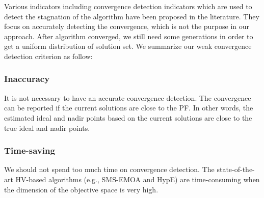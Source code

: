 \documentclass[conference]{IEEEtran}
\begin{document}
%
%
%
Various indicators including convergence detection indicators which are used to detect the stagnation of the algorithm 
have been proposed in the literature\cite{convergenceDetection:1, convergenceDetection:LSSC, 
convergenceDetection:OCD, convergenceDetection:OFCDandOCD, convergenceDetection:convergenceMetric, 
convergenceDetection:maxCD, convergenceDetection:online}. 
They focus on accurately detecting the convergence, which is not the purpose in our approach.
After algorithm converged, we still need some generations in order to
get a uniform distribution of solution set. 
We summarize our weak convergence detection criterion as follow:
\subsubsection{Inaccuracy} It is not necessary to have an accurate convergence detection. 
The convergence can be reported if the current solutions are close to the PF.
In other words, the estimated ideal and nadir points based on the current solutions
are close to the true ideal and nadir points. 
\subsubsection{Time-saving} We should not spend too much time on convergence detection. 
The state-of-the-art HV-based algorithms (e.g., SMS-EMOA and HypE) 
are time-consuming when the dimension of the objective space is very high. 
\end{document}
